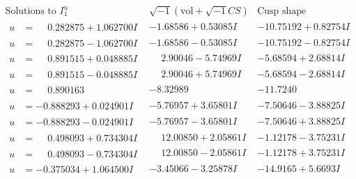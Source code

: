 \documentclass[1p]{elsarticle_modified}
\theoremstyle{definition}
\newcommand{\I}{\sqrt{-1}}
\begin{document}
$$\begin{array}{c|c|c}  
\text{Solutions to }I^u_{1}& \I (\text{vol} + \sqrt{-1}CS) & \text{Cusp shape}\\
 \hline 
\begin{aligned}
u &= \phantom{-}0.282875 + 1.062700 I\end{aligned}
 & -1.68586 + 0.53085 I & -10.75192 + 0.82754 I \\ \hline\begin{aligned}
u &= \phantom{-}0.282875 - 1.062700 I\end{aligned}
 & -1.68586 - 0.53085 I & -10.75192 - 0.82754 I \\ \hline\begin{aligned}
u &= \phantom{-}0.891515 + 0.048885 I\end{aligned}
 & \phantom{-}2.90046 - 5.74969 I & -5.68594 + 2.68814 I \\ \hline\begin{aligned}
u &= \phantom{-}0.891515 - 0.048885 I\end{aligned}
 & \phantom{-}2.90046 + 5.74969 I & -5.68594 - 2.68814 I \\ \hline\begin{aligned}
u &= \phantom{-}0.890163\phantom{ +0.000000I}\end{aligned}
 & -8.32989\phantom{ +0.000000I} & -11.7240\phantom{ +0.000000I} \\ \hline\begin{aligned}
u &= -0.888293 + 0.024901 I\end{aligned}
 & -5.76957 + 3.65801 I & -7.50646 - 3.88825 I \\ \hline\begin{aligned}
u &= -0.888293 - 0.024901 I\end{aligned}
 & -5.76957 - 3.65801 I & -7.50646 + 3.88825 I \\ \hline\begin{aligned}
u &= \phantom{-}0.498093 + 0.734304 I\end{aligned}
 & \phantom{-}12.00850 + 2.05861 I & -1.12178 - 3.75231 I \\ \hline\begin{aligned}
u &= \phantom{-}0.498093 - 0.734304 I\end{aligned}
 & \phantom{-}12.00850 - 2.05861 I & -1.12178 + 3.75231 I \\ \hline\begin{aligned}
u &= -0.375034 + 1.064500 I\end{aligned}
 & -3.45066 - 3.25878 I & -14.9165 + 5.6693 I \\ \hline\begin{aligned}

\end{aligned}
\end{array}$$
\end{document}
